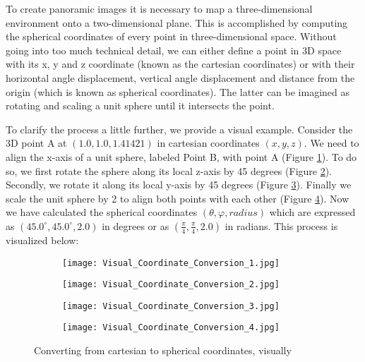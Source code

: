 To create panoramic images it is necessary to map a three-dimensional environment onto a two-dimensional plane. This is accomplished by computing the spherical coordinates of every point in three-dimensional space. Without going into too much technical detail, we can either define a point in 3D space with its x, y and z coordinate (known as the cartesian coordinates) or with their horizontal angle displacement, vertical angle displacement and distance from the origin (which is known as spherical coordinates). The latter can be imagined as rotating and scaling a unit sphere until it intersects the point.

To clarify the process a little further, we provide a visual example. Consider the 3D point A at {$(1.0, 1.0, 1.41421)$}  in cartesian coordinates {$(x, y, z)$}. We need to align the x-axis of a unit sphere, labeled Point B, with point A (Figure \ref{fig:visual_coordinate_conversion_1}). To do so, we first rotate the sphere along its local z-axis by 45 degrees (Figure \ref{fig:visual_coordinate_conversion_2}). Secondly, we rotate it along its local y-axis by 45 degrees (Figure \ref{fig:visual_coordinate_conversion_3}). Finally we scale the unit sphere by 2 to align both points with each other (Figure \ref{fig:visual_coordinate_conversion_4}). Now we have calculated the spherical coordinates {$(\theta, \varphi, radius)$} which are expressed as {$(45.0^{\circ}, 45.0^{\circ}, 2.0)$} in degrees or as {$(\frac{\pi}{4}, \frac{\pi}{4}, 2.0)$} in radians. This process is visualized below:

\begin{figure}[h]
	\centering
	\begin{subfigure}[b]{0.24\textwidth}
		\centering
		\texttt{[image: Visual\_Coordinate\_Conversion\_1.jpg]}
		\caption{}
		\label{fig:visual_coordinate_conversion_1}
	\end{subfigure}
	\hfill
	\begin{subfigure}[b]{0.24\textwidth}
		\centering
		\texttt{[image: Visual\_Coordinate\_Conversion\_2.jpg]}
		\caption{}
		\label{fig:visual_coordinate_conversion_2}
	\end{subfigure}
	\hfill
	\begin{subfigure}[b]{0.24\textwidth}
		\centering
		\texttt{[image: Visual\_Coordinate\_Conversion\_3.jpg]}
		\caption{}
		\label{fig:visual_coordinate_conversion_3}
	\end{subfigure}
	\hfill
	\begin{subfigure}[b]{0.24\textwidth}
		\centering
		\texttt{[image: Visual\_Coordinate\_Conversion\_4.jpg]}
		\caption{}
		\label{fig:visual_coordinate_conversion_4}
	\end{subfigure}
	
	\caption{Converting from cartesian to spherical coordinates, visually}
	\label{fig:converting_cartesian_to_spherical}
\end{figure}

